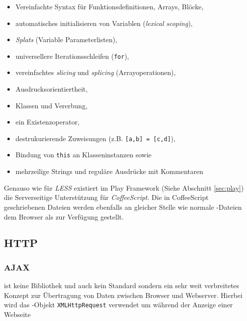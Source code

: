 \begin{itemize}
  \item Vereinfachte Syntax für Funktionsdefinitionen, Arrays, Blöcke,
  \item automatisches initialisieren von Variablen (\textit{lexical scoping}),
  \item \textit{Splats} (Variable Parameterlisten),
  \item universellere Iterationsschleifen (\texttt{for}),
  \item vereinfachtes \textit{slicing} und \textit{splicing} (Arrayoperationen),
  \item Ausdrucksorientiertheit,
  \item Klassen und Vererbung,
  \item ein Existenzoperator,
  \item destrukurierende Zuweisungen (z.B. \texttt{[a,b] = [c,d]}),
  \item Bindung von \texttt{this} an Klasseninstanzen sowie
  \item mehrzeilige Strings und reguläre Ausdrücke mit Kommentaren
\end{itemize}

Genauso wie für \textit{LESS} existiert im Play Framework (Siehe Abschnitt \ref{sec:play}) die
Serverseitige Unterstützung  für \textit{CoffeeScript}. Die in CoffeeScript geschriebenen
Dateien  werden ebenfalls an gleicher Stelle wie normale -Dateien dem  Browser
als  zur Verfügung gestellt.


\subsection{HTTP}

 

\subsubsection{AJAX}

 ist keine Bibliothek und auch kein  Standard sondern ein sehr
weit verbreitetes Konzept zur Übertragung von Daten  zwischen Browser und Webserver. Hierbei wird
das -Objekt \texttt{XMLHttpRequest} verwendet um während der Anzeige einer Webseite


